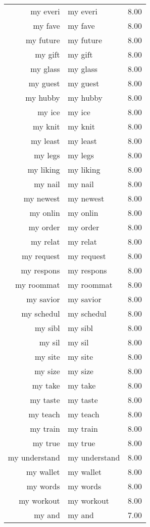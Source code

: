\begin{table}[ht]
\begin{tabular}{rlr}
  my everi & my everi & 8.00 \\ 
  my fave & my fave & 8.00 \\ 
  my future & my future & 8.00 \\ 
  my gift & my gift & 8.00 \\ 
  my glass & my glass & 8.00 \\ 
  my guest & my guest & 8.00 \\ 
  my hubby & my hubby & 8.00 \\ 
  my ice & my ice & 8.00 \\ 
  my knit & my knit & 8.00 \\ 
  my least & my least & 8.00 \\ 
  my legs & my legs & 8.00 \\ 
  my liking & my liking & 8.00 \\ 
  my nail & my nail & 8.00 \\ 
  my newest & my newest & 8.00 \\ 
  my onlin & my onlin & 8.00 \\ 
  my order & my order & 8.00 \\ 
  my relat & my relat & 8.00 \\ 
  my request & my request & 8.00 \\ 
  my respons & my respons & 8.00 \\ 
  my roommat & my roommat & 8.00 \\ 
  my savior & my savior & 8.00 \\ 
  my schedul & my schedul & 8.00 \\ 
  my sibl & my sibl & 8.00 \\ 
  my sil & my sil & 8.00 \\ 
  my site & my site & 8.00 \\ 
  my size & my size & 8.00 \\ 
  my take & my take & 8.00 \\ 
  my taste & my taste & 8.00 \\ 
  my teach & my teach & 8.00 \\ 
  my train & my train & 8.00 \\ 
  my true & my true & 8.00 \\ 
  my understand & my understand & 8.00 \\ 
  my wallet & my wallet & 8.00 \\ 
  my words & my words & 8.00 \\ 
  my workout & my workout & 8.00 \\ 
  my and & my and & 7.00 \\ 

\end{tabular}
\end{table}
